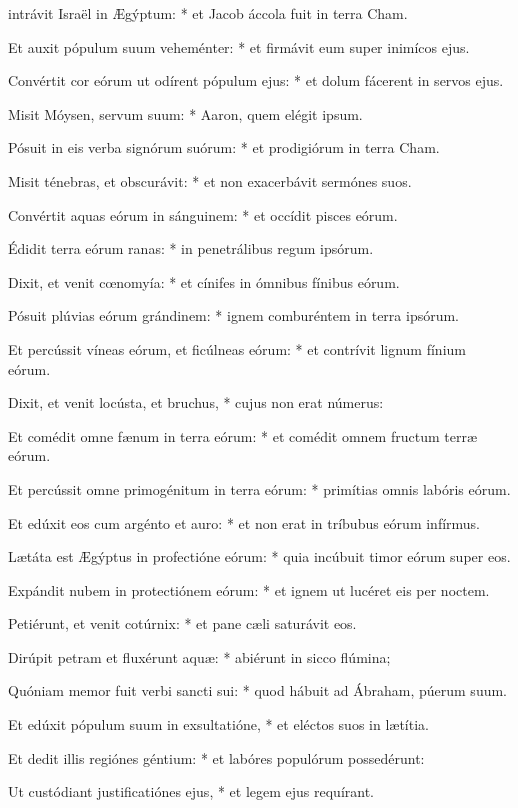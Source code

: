 \begin{psalmus}

 intrávit Israël in Ægýptum: * et Jacob áccola fuit in terra Cham.

Et auxit pópulum suum veheménter: * et firmávit eum super inimícos ejus.

Convértit cor eórum ut odírent pópulum ejus: * et dolum fácerent in servos ejus.

Misit Móysen, servum suum: * Aaron, quem elégit ipsum.

Pósuit in eis verba signórum suórum: * et prodigiórum in terra Cham.

Misit ténebras, et obscurávit: * et non exacerbávit sermónes suos.

Convértit aquas eórum in sánguinem: * et occídit pisces eórum.

Édidit terra eórum ranas: * in penetrálibus regum ipsórum.

Dixit, et venit cœnomyía: * et cínifes in ómnibus fínibus eórum.

Pósuit plúvias eórum grándinem: * ignem comburéntem in terra ipsórum.

Et percússit víneas eórum, et ficúlneas eórum: * et contrívit lignum fínium eórum.

Dixit, et venit locústa, et bruchus, * cujus non erat númerus:

Et comédit omne fænum in terra eórum: * et comédit omnem fructum terræ eórum.

Et percússit omne primogénitum in terra eórum: * primítias omnis labóris eórum.

Et edúxit eos cum argénto et auro: * et non erat in tríbubus eórum infírmus.

Lætáta est Ægýptus in profectióne eórum: * quia incúbuit timor eórum super eos.

Expándit nubem in protectiónem eórum: * et ignem ut lucéret eis per noctem.

Petiérunt, et venit cotúrnix: * et pane cæli saturávit eos.

Dirúpit petram et fluxérunt aquæ: * abiérunt in sicco flúmina;

Quóniam memor fuit verbi sancti sui: * quod hábuit ad Ábraham, púerum suum.

Et edúxit pópulum suum in exsultatióne, * et eléctos suos in lætítia.

Et dedit illis regiónes géntium: * et labóres populórum possedérunt:

Ut custódiant justificatiónes ejus, * et legem ejus requírant.

\end{psalmus}
